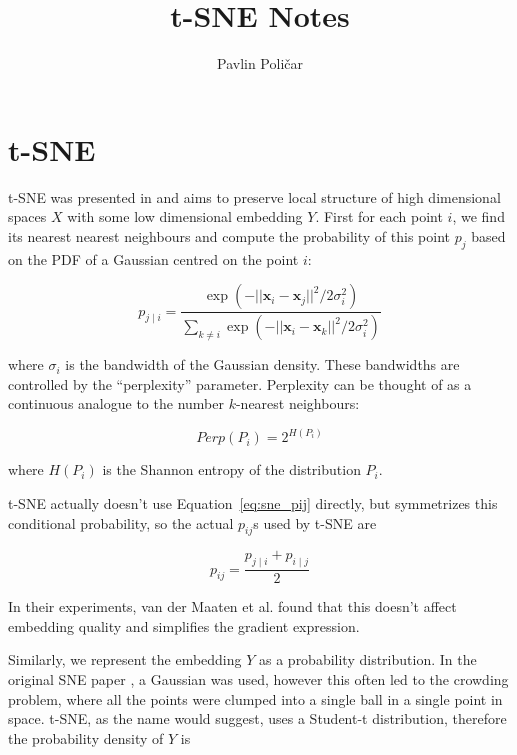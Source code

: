\documentclass[11pt]{article}
\begin{document}
\title{t-SNE Notes}
\author{Pavlin Poličar}
\date{}
\maketitle

\section{t-SNE}

t-SNE was presented in \cite{maaten2008visualizing} and aims to preserve local structure of high dimensional spaces $X$ with some low dimensional embedding $Y$. First for each point $i$, we find its nearest nearest neighbours and compute the probability of this point $p_j$ based on the PDF of a Gaussian centred on the point $i$:

\begin{equation}\label{eq:sne_pij}
p_{j \mid i} = \frac{\exp{\left (- || \mathbf{x}_i - \mathbf{x}_j ||^2 / 2\sigma_i^2 \right )}}{\sum_{k \neq i}\exp{\left (- || \mathbf{x}_i - \mathbf{x}_k ||^2 / 2\sigma_i^2 \right )}}
\end{equation}

where $\sigma_i$ is the bandwidth of the Gaussian density. These bandwidths are controlled by the ``perplexity'' parameter. Perplexity can be thought of as a continuous analogue to the number $k$-nearest neighbours:

\begin{equation}
Perp(P_i) = 2^{H(P_i)}
\end{equation}

where $H(P_i)$ is the Shannon entropy of the distribution $P_i$.

t-SNE actually doesn't use Equation~\ref{eq:sne_pij} directly, but symmetrizes this conditional probability, so the actual $p_{ij}$s used by t-SNE are

\begin{equation}
p_{ij} = \frac{p_{j\mid i} + p_{i \mid j}}{2}
\end{equation}

In their experiments, van der Maaten et al. found that this doesn't affect embedding quality and simplifies the gradient expression.

Similarly, we represent the embedding $Y$ as a probability distribution. In the original SNE paper \cite{hinton2003stochastic}, a Gaussian was used, however this often led to the crowding problem, where all the points were clumped into a single ball in a single point in space. t-SNE, as the name would suggest, uses a Student-t distribution, therefore the probability density of $Y$ is
\end{document}

